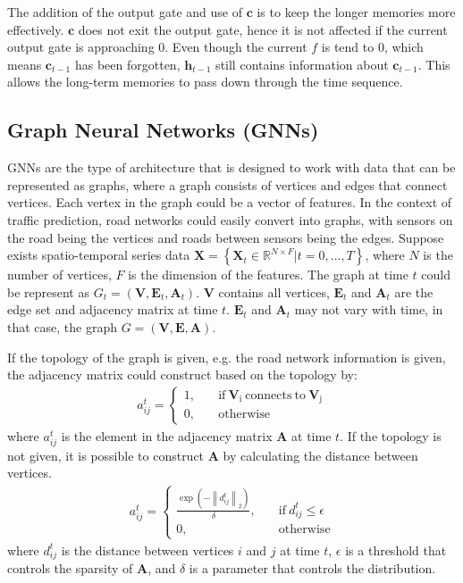 The addition of the output gate and use of $\mathbf{c}$ is to keep the longer memories more effectively. 
$\mathbf{c}$ does not exit the output gate, hence it is not affected if the current output gate is approaching 0. 
Even though the current $f$ is tend to 0, which means $\mathbf{c}_{t-1}$ has been forgotten, $\mathbf{h} _{t-1}$ still contains information about $\mathbf{c}_{t-1}$. 
This allows the long-term memories to pass down through the time sequence. 

\subsection{Graph Neural Networks (GNNs)}

GNNs are the type of architecture that is designed to work with data that can be represented as graphs, where a graph consists of vertices and edges that connect vertices. 
Each vertex in the graph could be a vector of features. 
In the context of traffic prediction, road networks could easily convert into graphs, with sensors on the road being the vertices and roads between sensors being the edges. 
Suppose exists spatio-temporal series data $\mathbf{X} = \left \{ \mathbf{X}_t \in \mathbb{R}^{N\times F} | t = 0, \dots, T\right \}$, where $N$ is the number of vertices, $F$ is the dimension of the features. 
The graph at time $t$ could be represent as $G_t = (\mathbf{V}, \mathbf{E}_t, \mathbf{A}_t)$. $\mathbf{V}$ contains all vertices, $\mathbf{E}_t$ and $\mathbf{A}_t$ are the edge set and adjacency matrix at time $t$. 
$\mathbf{E}_t$ and $\mathbf{A}_t$ may not vary with time, in that case, the graph $G = (\mathbf{V}, \mathbf{E}, \mathbf{A})$. 

If the topology of the graph is given, e.g. the road network information is given, the adjacency matrix could construct based on the topology by: 
\begin{gather}
    a_{ij}^t = \left\{\begin{aligned}
    1, &\quad \mathrm{if\ \mathbf{V}_i\ connects\ to\ \mathbf{V}_j}\\ \label{eq:top_adj}
    0, &\quad \mathrm{otherwise}
    \end{aligned}\right.
\end{gather}
where $a_{ij}^t$ is the element in the adjacency matrix $\mathbf{A}$ at time $t$. If the topology is not given, it is possible to construct $\mathbf{A}$ by calculating the distance between vertices.
\begin{gather}
    a_{ij}^t = \left\{\begin{aligned}
    \frac{\exp(-\left \| d_{ij}^t \right \|_2 )}{\delta}, &\quad \mathrm{if}\ d_{ij}^t \le \epsilon \\
    0, &\quad \mathrm{otherwise}
    \end{aligned}\right.
\end{gather}
where $d_{ij}^t$ is the distance between vertices $i$ and $j$ at time $t$, $\epsilon$ is a threshold that controls the sparsity of $\mathbf{A}$, and $\delta$ is a parameter that controls the distribution. 

